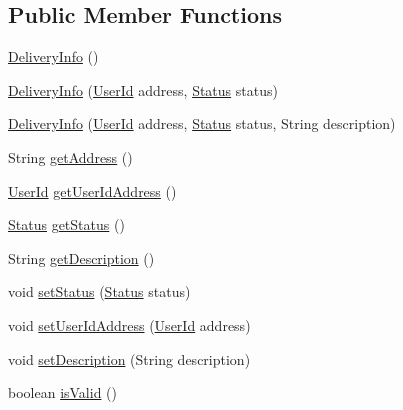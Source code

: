 \subsection*{Public Member Functions}
\begin{DoxyCompactItemize}
\item 
\hyperlink{classcom_1_1bluevia_1_1messagery_1_1mt_1_1data_1_1DeliveryInfo_a802eab022a200ca5a34f4384149b29e1}{DeliveryInfo} ()
\item 
\hyperlink{classcom_1_1bluevia_1_1messagery_1_1mt_1_1data_1_1DeliveryInfo_a823b0a686c30a2a4370ebf2c48917204}{DeliveryInfo} (\hyperlink{classcom_1_1bluevia_1_1commons_1_1data_1_1UserId}{UserId} address, \hyperlink{classcom_1_1bluevia_1_1messagery_1_1mt_1_1data_1_1DeliveryInfo_a37e8b97cdabdb2ac55c095e44cd8e32f}{Status} status)
\item 
\hyperlink{classcom_1_1bluevia_1_1messagery_1_1mt_1_1data_1_1DeliveryInfo_a7e06b8ee6a8c4108a4db5c83dece1dff}{DeliveryInfo} (\hyperlink{classcom_1_1bluevia_1_1commons_1_1data_1_1UserId}{UserId} address, \hyperlink{classcom_1_1bluevia_1_1messagery_1_1mt_1_1data_1_1DeliveryInfo_a37e8b97cdabdb2ac55c095e44cd8e32f}{Status} status, String description)
\item 
String \hyperlink{classcom_1_1bluevia_1_1messagery_1_1mt_1_1data_1_1DeliveryInfo_aa5a5dc9217232e671de794e320c1f639}{getAddress} ()
\item 
\hyperlink{classcom_1_1bluevia_1_1commons_1_1data_1_1UserId}{UserId} \hyperlink{classcom_1_1bluevia_1_1messagery_1_1mt_1_1data_1_1DeliveryInfo_a17318aed4cd299cf2ffd41dde841b81a}{getUserIdAddress} ()
\item 
\hyperlink{classcom_1_1bluevia_1_1messagery_1_1mt_1_1data_1_1DeliveryInfo_a37e8b97cdabdb2ac55c095e44cd8e32f}{Status} \hyperlink{classcom_1_1bluevia_1_1messagery_1_1mt_1_1data_1_1DeliveryInfo_acd23497dd99294230157ba2bca926029}{getStatus} ()
\item 
String \hyperlink{classcom_1_1bluevia_1_1messagery_1_1mt_1_1data_1_1DeliveryInfo_a7aacf398a91b1fcf29714e9a33564afc}{getDescription} ()
\item 
void \hyperlink{classcom_1_1bluevia_1_1messagery_1_1mt_1_1data_1_1DeliveryInfo_a8780a98a5c19cb5f87968b35379574d9}{setStatus} (\hyperlink{classcom_1_1bluevia_1_1messagery_1_1mt_1_1data_1_1DeliveryInfo_a37e8b97cdabdb2ac55c095e44cd8e32f}{Status} status)
\item 
void \hyperlink{classcom_1_1bluevia_1_1messagery_1_1mt_1_1data_1_1DeliveryInfo_a481b62f362b18fb47e662a50e23295ae}{setUserIdAddress} (\hyperlink{classcom_1_1bluevia_1_1commons_1_1data_1_1UserId}{UserId} address)
\item 
void \hyperlink{classcom_1_1bluevia_1_1messagery_1_1mt_1_1data_1_1DeliveryInfo_ade8639c5b730a6b0c179fe3dd99efea1}{setDescription} (String description)
\item 
boolean \hyperlink{classcom_1_1bluevia_1_1messagery_1_1mt_1_1data_1_1DeliveryInfo_ac18f88370fb0e88829f50b39862515b5}{isValid} ()
\end{DoxyCompactItemize}
